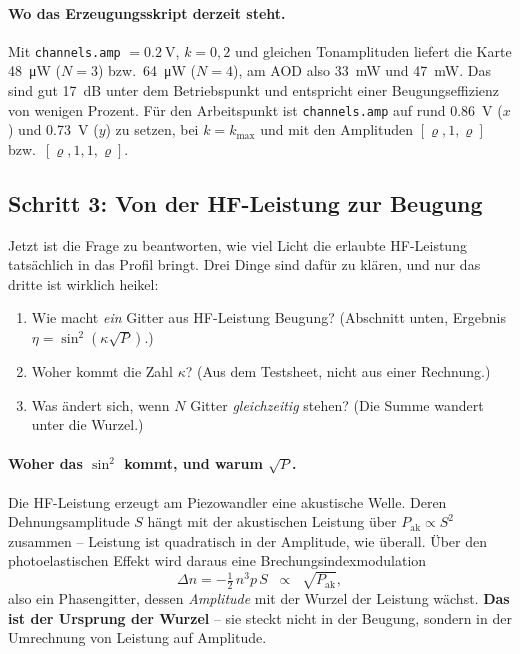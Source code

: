 \documentclass[11pt,a4paper]{article}
\begin{document}
\paragraph{Wo das Erzeugungsskript derzeit steht.}
Mit \texttt{channels.amp} $=\SI{0.2}{\volt}$, $k=0{,}2$ und gleichen
Tonamplituden liefert die Karte \SI{48}{\micro\watt} ($N=3$) bzw.\
\SI{64}{\micro\watt} ($N=4$), am AOD also \SI{33}{\milli\watt} und
\SI{47}{\milli\watt}. Das sind gut \SI{17}{\deci\bel} unter dem Betriebspunkt
und entspricht einer Beugungseffizienz von wenigen Prozent. Für den
Arbeitspunkt ist \texttt{channels.amp} auf rund \SI{0.86}{\volt} ($x$) und
\SI{0.73}{\volt} ($y$) zu setzen, bei $k=k_\mathrm{max}$ und mit den
Amplituden $[\varrho,1,\varrho]$ bzw.\ $[\varrho,1,1,\varrho]$.

\subsection{Schritt 3: Von der HF-Leistung zur Beugung}\label{sec:beugung}

Jetzt ist die Frage zu beantworten, wie viel Licht die erlaubte HF-Leistung
tatsächlich in das Profil bringt. Drei Dinge sind dafür zu klären, und nur
das dritte ist wirklich heikel:
\begin{enumerate}\itemsep0.15em
  \item Wie macht \emph{ein} Gitter aus HF-Leistung Beugung? (Abschnitt unten,
        Ergebnis $\eta=\sin^2(\kappa\sqrt{P})$.)
  \item Woher kommt die Zahl $\kappa$? (Aus dem Testsheet, nicht aus einer Rechnung.)
  \item Was ändert sich, wenn $N$ Gitter \emph{gleichzeitig} stehen?
        (Die Summe wandert unter die Wurzel.)
\end{enumerate}

\paragraph{Woher das \boldmath$\sin^2$ kommt, und warum \boldmath$\sqrt{P}$.}
Die HF-Leistung erzeugt am Piezowandler eine akustische Welle. Deren
Dehnungsamplitude $S$ hängt mit der akustischen Leistung über
$P_\mathrm{ak}\propto S^2$ zusammen -- Leistung ist quadratisch in der
Amplitude, wie überall. Über den photoelastischen Effekt wird daraus eine
Brechungsindexmodulation
\begin{equation}
  \Delta n = -\tfrac{1}{2}\,n^3 p\,S \;\;\propto\;\; \sqrt{P_\mathrm{ak}} ,
  \label{eq:photoelast}
\end{equation}
also ein Phasengitter, dessen \emph{Amplitude} mit der Wurzel der Leistung
wächst. \textbf{Das ist der Ursprung der Wurzel} -- sie steckt nicht in der
Beugung, sondern in der Umrechnung von Leistung auf Amplitude.
\end{document}
